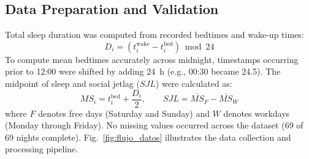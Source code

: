 \documentclass[conference]{IEEEtran}
\begin{document}
\begin{table}[ht]
\centering
\caption{Descriptive statistics ($n=69$ nights). Bedtime and wake-up time are expressed in 24-hour format.}
\label{tab:descriptiva}
\end{table}

\subsection{Data Preparation and Validation}
Total sleep duration was computed from recorded bedtimes and wake-up times:
\begin{equation}
D_i = (t_i^{\text{wake}} - t_i^{\text{bed}}) \bmod 24
\end{equation}
To compute mean bedtimes accurately across midnight, timestamps occurring prior to 12:00 were shifted by adding 24~h (e.g., 00:30 became 24.5). The midpoint of sleep and social jetlag ($SJL$) were calculated as:
\begin{equation}
MS_i = t_i^{\text{bed}} + \frac{D_i}{2}, \qquad SJL = \overline{MS}_F - \overline{MS}_W
\end{equation}
where $F$ denotes free days (Saturday and Sunday) and $W$ denotes workdays (Monday through Friday). No missing values occurred across the dataset (69 of 69 nights complete). Fig.~\ref{fig:flujo_datos} illustrates the data collection and processing pipeline.
\end{document}
